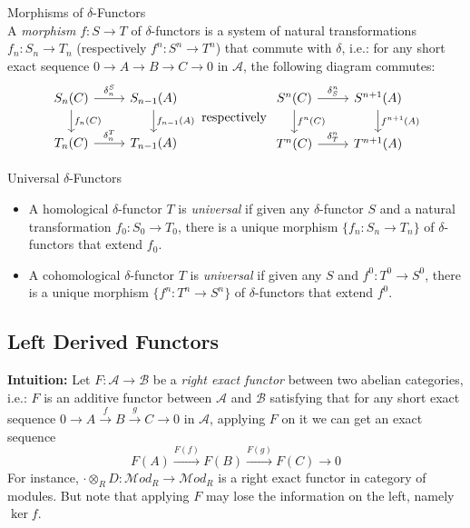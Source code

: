 \begin{definition}{Morphisms of $\delta$-Functors}\\
A \textit{morphism} $f:S\to T$ of $\delta$-functors is a system of natural transformations $f_n: S_n\to T_n$ (respectively $f^n:S^n\to T^n$) that commute with $\delta$, i.e.: for any short exact sequence $0\to A\to B\to C \to0$ in $\mathcal{A}$, the following diagram commutes:
\[
\begin{tikzcd}
    S_n (C) \arrow[r, "\delta_n^S"] \arrow[d, "f_n(C)"] &S_{n-1} (A) \arrow[d, "f_{n-1} (A)"]\\
    T_n(C) \arrow[r, "\delta_n^T"] &T_{n-1} (A)
\end{tikzcd}
\text{ respectively }
\begin{tikzcd}
    S^n (C) \arrow[r, "\delta_S^n"] \arrow[d, "f^n (C)"] &S^{n+1} (A) \arrow[d, "f^{n+1} (A)"] \\
    T^n(C) \arrow[r, "\delta_T^n"] &T^{n+1} (A)
\end{tikzcd}
\]
\end{definition}

\begin{definition}{Universal $\delta$-Functors}
\begin{itemize}
    \item A homological $\delta$-functor $T$ is \textit{universal} if given any $\delta$-functor $S$ and a natural transformation $f_0 :S_0\to T_0$, there is a unique morphism $\{f_n:S_n \to T_n\}$ of $\delta$-functors that extend $f_0$.

    \item A cohomological $\delta$-functor $T$ is \textit{universal} if given any $S$ and $f^0:T^0\to S^0$, there is a unique morphism $\{f^n:T^n \to S^n\}$ of $\delta$-functors that extend $f^0$.
\end{itemize}
\end{definition}

\subsection{Left Derived Functors}

\noindent\textbf{Intuition:} Let $F: \mathcal{A} \to \mathcal{B}$ be a \textit{right exact functor} between two abelian categories, i.e.: $F$ is an additive functor between $\mathcal{A}$ and $\mathcal{B}$ satisfying that for any short exact sequence $0 \to A \xrightarrow{f} B \xrightarrow{g} C\to 0$ in $\mathcal{A}$, applying $F$ on it we can get an exact sequence
\[
F(A) \xrightarrow{F(f)} F(B) \xrightarrow{F(g)} F(C) \to0
\]
For instance, $\cdot \otimes_R D:\mathcal{M}od_R \to \mathcal{M}od_R$ is a right exact functor in category of modules. But note that applying $F$ may lose the information on the left, namely $\ker f$.

